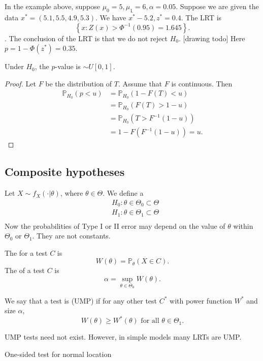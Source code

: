 \documentclass[egregdoesnotlikesansseriftitles,a4paper]{scrartcl}
\begin{document}
In the example above, suppose $\mu_0 =5, \mu_1 =6, \alpha=0.05 $. Suppose we are given the data $x^* =(5.1,5.5, 4.9,5.3)$. We have $\overline{x^*}-5.2, z^*=0.4$. The LRT is \[
     \left\{x: Z (x)> \Phi^{-1} (0.95)=1.645\right\}
.\] . The conclusion of the LRT is that we do not reject $H_0 $. [drawing todo] Here $p=1-\Phi (z^*)=0.35$. 
\begin{proposition}
      Under $H_0$, the $p$-value is $\sim U[0,1]$.
\end{proposition}
\begin{proof}
     Let $F$ be the distribution of $T$. Assume that $F$ is continuous. Then 
     \begin{align*}
          \mathbb{P}_{H_0 }(p< u)&=\mathbb{P}_{H_0 } (1-F (T)<u)\\
          &=\mathbb{P}_{H_0 } (F (T)>1-u)\\
          &= \mathbb{P}_{H_0 } (T > F^{-1}(1-u))\\
          &= 1-F(F^{-1}(1-u))=u.
     \end{align*}
\end{proof}
\subsection{Composite hypotheses}
Let $X \sim f_{X}(\cdot |\theta)$, where $\theta \in \Theta$. We define a  
\begin{align*}
     &H_0: \theta\in \Theta_{0} \subset \Theta\\
     &H_1: \theta\in \Theta_{1} \subset \Theta\\
\end{align*}
Now the probabilities of Type I or II error may depend on the value of $\theta$ within $\Theta_0 $ or $\Theta_1 $. They are not constants.
\begin{definition*}
      The  for a test $C$ is \[
      W (\theta)=\mathbb{P}_{\theta}(X \in C)
      .\] The  of a test $C$ is \[
      \alpha= \sup_{\theta \in \Theta_0 } W (\theta)
      .\]
\end{definition*}
We say that a test is  (UMP) if for any other test $C^* $ with power function $W^*$ and size $\alpha$, \[
W (\theta) \geq W^* (\theta) \text{ for all } \theta \in \Theta_{1}
.\]\begin{remark}
      UMP tests need not exist. However, in simple models many LRTs are UMP.
\end{remark}
\begin{example*}
      One-sided test for normal location
\end{example*}
\end{document}
